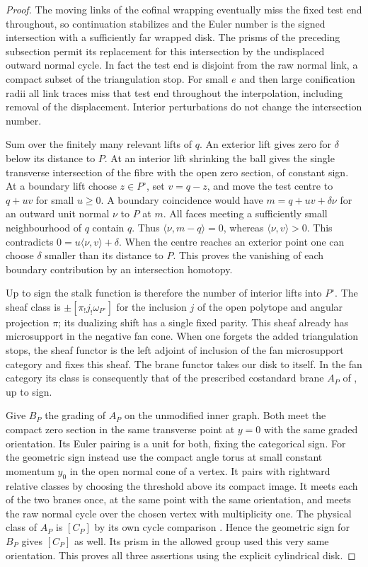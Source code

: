 \begin{proof}
The moving links of the cofinal wrapping eventually miss the fixed test end throughout, so continuation stabilizes and the Euler number is the signed intersection with a sufficiently far wrapped disk. The prisms of the preceding subsection permit its replacement for this intersection by the undisplaced outward normal cycle. In fact the test end is disjoint from the raw normal link, a compact subset of the triangulation stop. For small $e$ and then large conification radii all link traces miss that test end throughout the interpolation, including removal of the displacement. Interior perturbations do not change the intersection number.

Sum over the finitely many relevant lifts of $q$. An exterior lift gives zero for $\delta$ below its distance to $P$. At an interior lift shrinking the ball gives the single transverse intersection of the fibre with the open zero section, of constant sign. At a boundary lift choose $z\in P^\circ$, set $v=q-z$, and move the test centre to $q+uv$ for small $u\ge0$. A boundary coincidence would have $m=q+uv+\delta\nu$ for an outward unit normal $\nu$ to $P$ at $m$. All faces meeting a sufficiently small neighbourhood of $q$ contain $q$. Thus $\langle\nu,m-q\rangle=0$, whereas $\langle\nu,v\rangle>0$. This contradicts $0=u\langle\nu,v\rangle+\delta$. When the centre reaches an exterior point one can choose $\delta$ smaller than its distance to $P$. This proves the vanishing of each boundary contribution by an intersection homotopy.

Up to sign the stalk function is therefore the number of interior lifts into $P^\circ$. The sheaf class is $\pm[\pi_!j_!\omega_{P^\circ}]$ for the inclusion $j$ of the open polytope and angular projection $\pi$; its dualizing shift has a single fixed parity. This sheaf already has microsupport in the negative fan cone. When one forgets the added triangulation stops, the sheaf functor is the left adjoint of inclusion of the fan microsupport category and fixes this sheaf. The brane functor takes our disk to itself. In the fan category its class is consequently that of the prescribed costandard brane $A_P$ of \cite[\S5.2, Proposition~5.2 and Corollary~5.3]{FZ}, up to sign.

Give $B_P$ the grading of $A_P$ on the unmodified inner graph. Both meet the compact zero section in the same transverse point at $y=0$ with the same graded orientation. Its Euler pairing is a unit for both, fixing the categorical sign. For the geometric sign instead use the compact angle torus at small constant momentum $y_0$ in the open normal cone of a vertex. It pairs with rightward relative classes by choosing the threshold above its compact image. It meets each of the two branes once, at the same point with the same orientation, and meets the raw normal cycle over the chosen vertex with multiplicity one. The physical class of $A_P$ is $[C_P]$ by its own cycle comparison \cite[\S5.2]{FZ}. Hence the geometric sign for $B_P$ gives $[C_P]$ as well. Its prism in the allowed group used this very same orientation. This proves all three assertions using the explicit cylindrical disk.
\end{proof}

